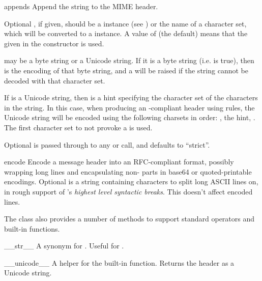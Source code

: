 \begin{methoddesc}[Header]{append}{s}
Append the string  to the MIME header.

Optional , if given, should be a  instance
(see ) or the name of a character set, which
will be converted to a  instance.  A value of
 (the default) means that the  given in the
constructor is used.

 may be a byte string or a Unicode string.  If it is a byte
string (i.e.  is true), then
 is the encoding of that byte string, and a
 will be raised if the string cannot be
decoded with that character set.

If  is a Unicode string, then  is a hint
specifying the character set of the characters in the string.  In this
case, when producing an -compliant header using 
rules, the Unicode string will be encoded using the following charsets
in order: , the  hint, .  The
first character set to not provoke a  is used.

Optional  is passed through to any  or
 call, and defaults to ``strict''.
\end{methoddesc}

\begin{methoddesc}[Header]{encode}{}
Encode a message header into an RFC-compliant format, possibly
wrapping long lines and encapsulating non-\ASCII{} parts in base64 or
quoted-printable encodings.  Optional  is a string
containing characters to split long ASCII lines on, in rough support
of 's \emph{highest level syntactic breaks}.  This doesn't
affect  encoded lines.
\end{methoddesc}

The  class also provides a number of methods to support
standard operators and built-in functions.

\begin{methoddesc}[Header]{__str__}{}
A synonym for .  Useful for
.
\end{methoddesc}

\begin{methoddesc}[Header]{__unicode__}{}
A helper for the built-in  function.  Returns the
header as a Unicode string.
\end{methoddesc}

